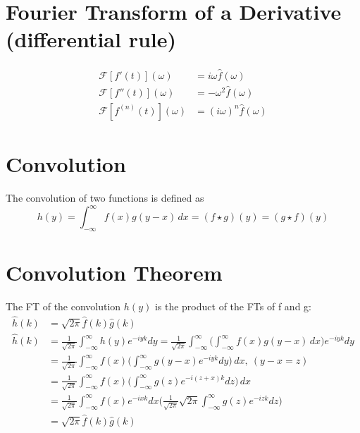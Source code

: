 \documentclass[a4paper, 11pt, normalem]{report}
\newcommand\ifnt{\int_{-\infty}^{\infty}}
\newcommand\F{\mathcal{F}}
\newcommand\om{\omega}
\begin{document}
\section{Fourier Transform of a Derivative (differential rule)}
\begin{align*}
    \F[f'(t)](\om) &= i\om \hat{f}(\om) \\
    \F[f''(t)](\om) &= -\om^2 \hat{f}(\om) \\
    \F[f^{(n)}(t)](\om) &= (i\om)^n \hat{f}(\om)
\end{align*}

\section{Convolution}
The convolution of two functions is defined as
\begin{equation*}
    h(y) = \ifnt f(x)g(y - x)\,dx = (f \star g)(y) = (g \star f)(y)
\end{equation*}

\section{Convolution Theorem}
The FT of the convolution $h(y)$ is the product of the FTs of f and g:
\begin{align*}
    \hat{h}(k) &= \sqrt{2\pi} \hat{f}(k) \hat{g}(k) \\
    \hat{h}(k) &= \frac{1}{\sqrt{2\pi}} \ifnt h(y)e^{-iyk}dy = \frac{1}{\sqrt{2\pi}} \ifnt \Bigg(\ifnt f(x)g(y - x)\,dx\Bigg)e^{-iyk}dy \\
    &= \frac{1}{\sqrt{2\pi}} \ifnt f(x) \Bigg(\ifnt g(y - x)e^{-iyk}dy\Bigg)\,dx, ~ (y - x = z) \\
    &= \frac{1}{\sqrt{2\pi}} \ifnt f(x) \Bigg(\ifnt g(z)e^{-i(z + x)k}dz\Bigg)\,dx \\
    &= \frac{1}{\sqrt{2\pi}} \ifnt f(x)e^{-ixk}dx \Bigg(\frac{1}{\sqrt{2\pi}}\sqrt{2\pi} \ifnt g(z)e^{-izk}dz \Bigg) \\
    &= \sqrt{2\pi} \hat{f}(k) \hat{g}(k)
\end{align*}
\end{document}

